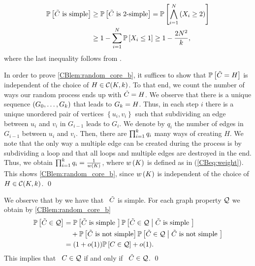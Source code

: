 \begin{align*}
\prob{\randomMultiCore\text{ is simple}}&\geq \prob{\randomMultiCore\text{ is \2s}}= \prob{\bigwedge_{\ind=1}^\nc \left(X_\ind \geq 2\right)}
\\
&\geq 1- \sum_{\ind=1}^{\nc}\prob{X_\ind \leq 1} \geq 1-\frac{2\nc^2}{\nd}, 
\end{align*} 
where the last inequality follows from .
 
In order to prove \ref{CBlem:random_core_b}, it suffices to show that $\mathbb{P}\left[\tilde{C}=H\right]$ is independent of the choice of $H \in \mathcal{C}(K,k)$. To that end, we count the number of ways our random process ends up with $\tilde{C}=H$. We observe that there is a unique sequence $(G_0, \ldots, G_k)$ that leads to $G_k=H$. Thus, in each step $i$ there is a unique unordered pair of vertices $\left\{u_i, v_i\right\}$ such that subdividing an edge between $u_i$ and $v_i$ in $G_{i-1}$ leads to $G_i$. We denote by $q_i$ the number of edges in $G_{i-1}$ between $u_i$ and $v_i$. Then, there are $\prod_{i=1}^{k}q_i$ many ways of creating $H$. We note that the only way a multiple edge can be created during the process is by subdividing a loop and that all loops and multiple edges are destroyed in the end. Thus, we obtain $\prod_{i=1}^{k}q_i=\frac{1}{w\left(K\right)}$, where $w\left(K\right)$ is defined as in (\ref{CBeq:weight}). This shows \ref{CBlem:random_core_b}, since $w\left(K\right)$ is independent of the choice of $H \in \mathcal{C}(K,k)$.
\qed

We observe that by  we have that \whp\ $\tilde{C}$ is simple. For each graph property $\mathcal{Q}$ we obtain by \ref{CBlem:random_core_b}
\begin{align*}
\mathbb{P}\left[\tilde{C} \in \mathcal{Q}\right]&=\mathbb{P}\left[\tilde{C} \text{ is simple }\right]\mathbb{P}\left[\tilde{C} \in \mathcal{Q} \;\middle|\; \tilde{C} \text{ is simple }\right]
\\
&~~~+\mathbb{P}\left[\tilde{C} \text{ is not simple}\right]\mathbb{P}\left[\tilde{C} \in \mathcal{Q} \;\middle|\; \tilde{C} \text{ is not simple }\right]
\\
&=(1+o(1))\mathbb{P}\left[C \in \mathcal{Q}\right]+o(1).
\end{align*}
This implies that \whp\ $C \in \mathcal{Q}$ if and only if \whp\ $\tilde{C}\in\mathcal{Q}$. \qed 

